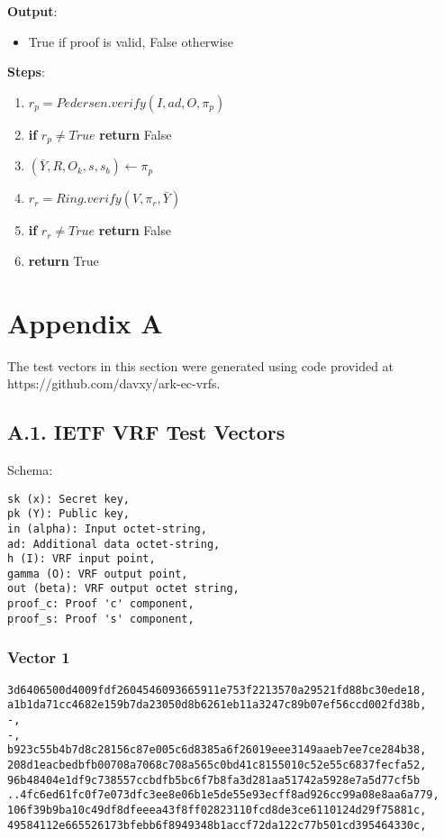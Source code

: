 \documentclass[
]{article}
\providecommand{\tightlist}{%
  \setlength{\itemsep}{0pt}\setlength{\parskip}{0pt}}
\begin{document}
\textbf{Output}:

\begin{itemize}
\tightlist
\item
  True if proof is valid, False otherwise
\end{itemize}

\textbf{Steps}:

\begin{enumerate}
\def\labelenumi{\arabic{enumi}.}
\tightlist
\item
  \(r_p = Pedersen.verify(I, ad, O, \pi_p)\)
\item
  \textbf{if} \(r_p \neq True\) \textbf{return} False
\item
  \((\bar{Y}, R, O_k, s, s_b) \leftarrow \pi_p\)
\item
  \(r_r = Ring.verify(V, \pi_r, \bar{Y})\)
\item
  \textbf{if} \(r_r \neq True\) \textbf{return} False
\item
  \textbf{return} True
\end{enumerate}

\hypertarget{appendix-a}{%
\section{Appendix A}\label{appendix-a}}

The test vectors in this section were generated using code provided at
https://github.com/davxy/ark-ec-vrfs.

\hypertarget{a.1.-ietf-vrf-test-vectors}{%
\subsection{A.1. IETF VRF Test
Vectors}\label{a.1.-ietf-vrf-test-vectors}}

Schema:

\begin{verbatim}
sk (x): Secret key,
pk (Y): Public key,
in (alpha): Input octet-string,
ad: Additional data octet-string,
h (I): VRF input point,
gamma (O): VRF output point,
out (beta): VRF output octet string,
proof_c: Proof 'c' component,
proof_s: Proof 's' component,
\end{verbatim}

\hypertarget{vector-1}{%
\subsubsection{Vector 1}\label{vector-1}}

\begin{verbatim}
3d6406500d4009fdf2604546093665911e753f2213570a29521fd88bc30ede18,
a1b1da71cc4682e159b7da23050d8b6261eb11a3247c89b07ef56ccd002fd38b,
-,
-,
b923c55b4b7d8c28156c87e005c6d8385a6f26019eee3149aaeb7ee7ce284b38,
208d1eacbedbfb00708a7068c708a565c0bd41c8155010c52e55c6837fecfa52,
96b48404e1df9c738557ccbdfb5bc6f7b8fa3d281aa51742a5928e7a5d77cf5b
..4fc6ed61fc0f7e073dfc3ee8e06b1e5de55e93ecff8ad926cc99a08e8aa6a779,
106f39b9ba10c49df8dfeeea43f8ff02823110fcd8de3ce6110124d29f75881c,
49584112e665526173bfebb6f8949348b1accf72da122c77b501cd395464330c,
\end{verbatim}
\end{document}
